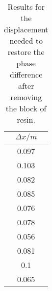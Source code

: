 \begin{table}
  \centering
  \caption{Results for the displacement needed to restore the phase difference after removing the
  block of resin.}
  \label{tab:results_resin}
  \begin{tabular}{c}
    $\Delta x / \si{m}$ \\
    \hline
    0.097  \\
    0.103  \\
    0.082  \\
    0.085  \\
    0.076  \\
    0.078  \\
    0.056  \\
    0.081  \\
    0.1    \\
    0.065  \\
  \end{tabular}
\end{table}
